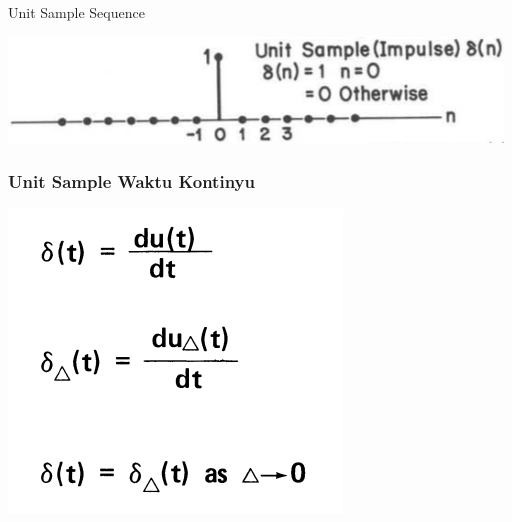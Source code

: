 \documentclass[pdflatex,compress]{beamer}
\begin{document}
\begin{frame}{Unit Sample Sequence}
	\begin{center}
		\includegraphics[width=\linewidth]{img/img002}
	\end{center}
\end{frame}

\begin{frame}
	\frametitle{Unit Sample Waktu Kontinyu}
	\begin{multicols}{2}
		\begin{center}
			\includegraphics[width=0.7\linewidth]{img/img004}
		\end{center}
	\columnbreak
		\begin{center}

\end{center}
\end{multicols}
\end{frame}
\end{document}
